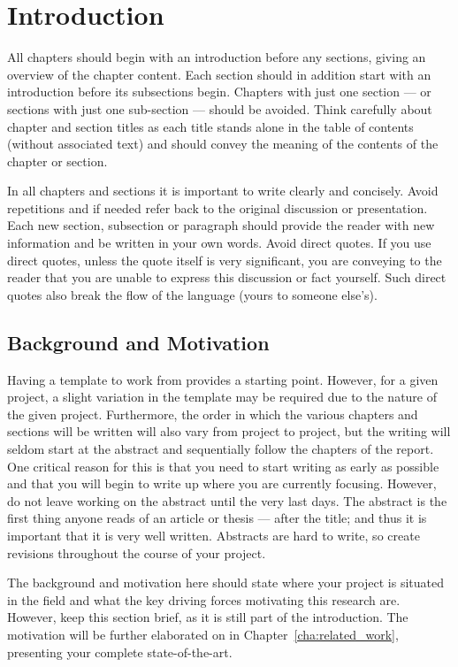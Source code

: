 \chapter{Introduction}
\label{cha:introduction}

All chapters should begin with an introduction before any sections, giving an overview of the chapter content. 
Each section should in addition start with an introduction before its subsections begin. 
Chapters with just one section --- or sections with just one sub-section --- should be avoided. 
Think carefully about chapter and section titles as each title stands alone in the table of contents (without associated text) 
and should convey the meaning of the contents of the chapter or section. 

In all chapters and sections it is important to write clearly and concisely. Avoid repetitions and if needed refer back to the original discussion or presentation. 
Each new section, subsection or paragraph should provide the reader with new information and be written in your own words. Avoid direct quotes. 
If you use direct quotes, unless the quote itself is very significant, you are conveying to the reader that you are unable to express this discussion or fact yourself. 
Such direct quotes also break the flow of the language (yours to someone else's).   

\section{Background and Motivation}
\label{sec:BackgroundAndMotivation}

Having a template to work from provides a starting point. 
However, for a given project, a slight variation in the template may be required due to the nature of the given project. 
Furthermore, the order in which the various chapters and sections will be written will also vary from project to project, 
but the writing will seldom start at the abstract and sequentially follow the chapters of the report. 
One critical reason for this is that you need to start writing as early as possible and that you will begin to write up where you are currently focusing. 
However, do not leave working on the abstract until the very last days. The abstract is the first thing anyone reads of an article or thesis --- after the title; 
and thus it is important that it is very well written. Abstracts are hard to write, so create revisions throughout the course of your project.  

The background and motivation here should state where your project is situated in the field and what the key driving forces motivating this research are. 
However, keep this section brief, as it is still part of the introduction. 
The motivation will be further elaborated on in Chapter~\ref{cha:related_work}, presenting your complete state-of-the-art. 

